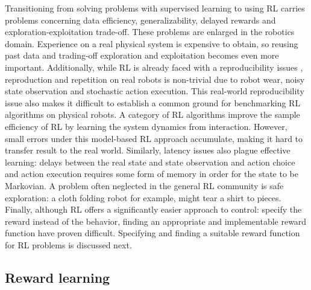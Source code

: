 \documentclass[\home/main.tex]{subfiles}
\begin{document}
Transitioning from solving problems with supervised learning to using RL carries problems concerning data efficiency, generalizability, delayed rewards and exploration-exploitation trade-off. These problems are enlarged in the robotics domain.
Experience on a real physical system is expensive to obtain, so reusing past data and trading-off exploration and exploitation becomes even more important.
Additionally, while RL is already faced with a reproducibility issues \autocite{henderson2018deep}, reproduction and repetition on real robots is non-trivial due to robot wear, noisy state observation and stochastic action execution. This real-world reproducibility issue also makes it difficult to establish a common ground for benchmarking RL algorithms on physical robots.
A category of RL algorithms improve the sample efficiency of RL by learning the system dynamics from interaction. However, small errors under this model-based RL approach accumulate, making it hard to transfer result to the real world.
Similarly, latency issues also plague effective learning: delays between the real state and state observation and action choice and action execution requires some form of memory in order for the state to be Markovian.
A problem often neglected in the general RL community is safe exploration: a cloth folding robot for example, might tear a shirt to pieces.
Finally, although RL offers a significantly easier approach to control: specify the reward instead of the behavior, finding an appropriate and implementable reward function have proven difficult. Specifying and finding a suitable reward function for RL problems is discussed next.

\subsection{Reward learning}  \label{subsec:lit_reward_learning}
\end{document}
